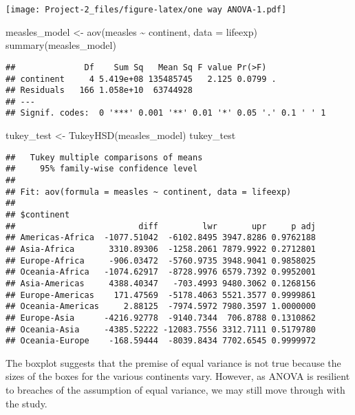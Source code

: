 \documentclass[
]{article}
\newenvironment{Shaded}{\begin{snugshade}}{\end{snugshade}}
\newcommand{\AttributeTok}[1]{\textcolor[rgb]{0.77,0.63,0.00}{#1}}
\newcommand{\FunctionTok}[1]{\textcolor[rgb]{0.00,0.00,0.00}{#1}}
\newcommand{\NormalTok}[1]{#1}
\newcommand{\OtherTok}[1]{\textcolor[rgb]{0.56,0.35,0.01}{#1}}
\newcommand{\SpecialCharTok}[1]{\textcolor[rgb]{0.00,0.00,0.00}{#1}}
\begin{document}
\texttt{[image: Project-2\_files/figure-latex/one way ANOVA-1.pdf]}

\begin{Shaded}
\begin{Highlighting}[]
\NormalTok{measles\_model }\OtherTok{\textless{}{-}} \FunctionTok{aov}\NormalTok{(measles }\SpecialCharTok{\textasciitilde{}}\NormalTok{ continent, }\AttributeTok{data =}\NormalTok{ lifeexp)}
\FunctionTok{summary}\NormalTok{(measles\_model)}
\end{Highlighting}
\end{Shaded}

\begin{verbatim}
##              Df    Sum Sq   Mean Sq F value Pr(>F)  
## continent     4 5.419e+08 135485745   2.125 0.0799 .
## Residuals   166 1.058e+10  63744928                 
## ---
## Signif. codes:  0 '***' 0.001 '**' 0.01 '*' 0.05 '.' 0.1 ' ' 1
\end{verbatim}

\begin{Shaded}
\begin{Highlighting}[]
\NormalTok{tukey\_test }\OtherTok{\textless{}{-}} \FunctionTok{TukeyHSD}\NormalTok{(measles\_model)}
\NormalTok{tukey\_test}
\end{Highlighting}
\end{Shaded}

\begin{verbatim}
##   Tukey multiple comparisons of means
##     95% family-wise confidence level
## 
## Fit: aov(formula = measles ~ continent, data = lifeexp)
## 
## $continent
##                         diff         lwr       upr     p adj
## Americas-Africa  -1077.51042  -6102.8495 3947.8286 0.9762188
## Asia-Africa       3310.89306  -1258.2061 7879.9922 0.2712801
## Europe-Africa     -906.03472  -5760.9735 3948.9041 0.9858025
## Oceania-Africa   -1074.62917  -8728.9976 6579.7392 0.9952001
## Asia-Americas     4388.40347   -703.4993 9480.3062 0.1268156
## Europe-Americas    171.47569  -5178.4063 5521.3577 0.9999861
## Oceania-Americas     2.88125  -7974.5972 7980.3597 1.0000000
## Europe-Asia      -4216.92778  -9140.7344  706.8788 0.1310862
## Oceania-Asia     -4385.52222 -12083.7556 3312.7111 0.5179780
## Oceania-Europe    -168.59444  -8039.8434 7702.6545 0.9999972
\end{verbatim}

The boxplot suggests that the premise of equal variance is not true
because the sizes of the boxes for the various continents vary. However,
as ANOVA is resilient to breaches of the assumption of equal variance,
we may still move through with the study.
\end{document}
